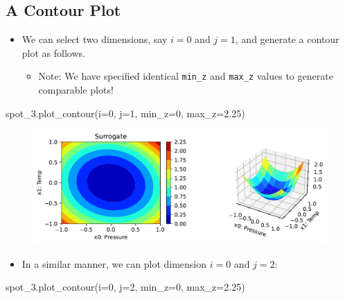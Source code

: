 \documentclass[
  letterpaper,
  DIV=11,
  numbers=noendperiod]{scrreprt}
\newenvironment{Shaded}{\begin{snugshade}}{\end{snugshade}}
\newcommand{\DecValTok}[1]{\textcolor[rgb]{0.68,0.00,0.00}{#1}}
\newcommand{\FloatTok}[1]{\textcolor[rgb]{0.68,0.00,0.00}{#1}}
\newcommand{\NormalTok}[1]{\textcolor[rgb]{0.00,0.23,0.31}{#1}}
\newcommand{\OperatorTok}[1]{\textcolor[rgb]{0.37,0.37,0.37}{#1}}
\providecommand{\tightlist}{%
  \setlength{\itemsep}{0pt}\setlength{\parskip}{0pt}}\usepackage{longtable,booktabs,array}
\begin{document}
\hypertarget{a-contour-plot}{%
\subsection{A Contour Plot}\label{a-contour-plot}}

\begin{itemize}
\tightlist
\item
  We can select two dimensions, say \(i=0\) and \(j=1\), and generate a
  contour plot as follows.

  \begin{itemize}
  \tightlist
  \item
    Note: We have specified identical \texttt{min\_z} and
    \texttt{max\_z} values to generate comparable plots!
  \end{itemize}
\end{itemize}

\begin{Shaded}
\begin{Highlighting}[]
\NormalTok{spot\_3.plot\_contour(i}\OperatorTok{=}\DecValTok{0}\NormalTok{, j}\OperatorTok{=}\DecValTok{1}\NormalTok{, min\_z}\OperatorTok{=}\DecValTok{0}\NormalTok{, max\_z}\OperatorTok{=}\FloatTok{2.25}\NormalTok{)}
\end{Highlighting}
\end{Shaded}

\begin{figure}[H]

{\centering \includegraphics{008_num_spot_multidim_files/figure-pdf/cell-8-output-1.pdf}

}

\end{figure}

\begin{itemize}
\tightlist
\item
  In a similar manner, we can plot dimension \(i=0\) and \(j=2\):
\end{itemize}

\begin{Shaded}
\begin{Highlighting}[]
\NormalTok{spot\_3.plot\_contour(i}\OperatorTok{=}\DecValTok{0}\NormalTok{, j}\OperatorTok{=}\DecValTok{2}\NormalTok{, min\_z}\OperatorTok{=}\DecValTok{0}\NormalTok{, max\_z}\OperatorTok{=}\FloatTok{2.25}\NormalTok{)}
\end{Highlighting}
\end{Shaded}
\end{document}
